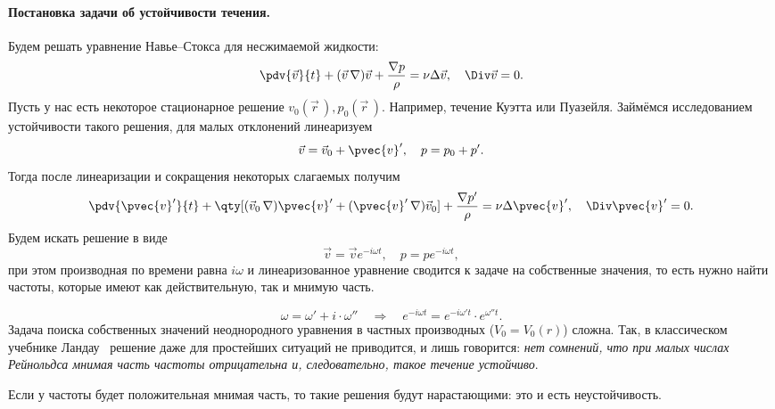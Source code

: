 \paragraph{Постановка задачи об устойчивости течения.} Будем решать
уравнение Навье--Стокса для несжимаемой жидкости:
\begin{equation}
    \pdv{\vec{v}}{t}+ (\vec{v}\,\nabla) \vec{v} + \frac{\nabla p}{\rho}=
    \nu \Delta \vec{v}, \quad \Div \vec{v} = 0.
\end{equation}
Пусть у нас есть некоторое стационарное решение
$v_0(\vec{r}\,), p_0(\vec{r}\,)$.
Например, течение Куэтта или Пуазейля. Займёмся исследованием
устойчивости такого решения, для малых отклонений линеаризуем
\begin{equation}
    \vec{v}=\vec{v}_0+\pvec{v}', \quad p = p_0 +p'.
\end{equation}
Тогда после линеаризации и сокращения некоторых слагаемых получим
\begin{equation}
    \pdv{\pvec{v}'}{t}+\qty[(\vec{v}_0\,\nabla) \pvec{v}'+
        (\pvec{v}'\,\nabla)\vec{v}_0] + \frac{\nabla p'}{\rho}=
    \nu \Delta \pvec{v}', \quad \Div \pvec{v}' = 0.
\end{equation}
Будем искать решение в виде
\begin{equation}
    \vec{v} = \vec{v}e^{-i\omega t}, \quad
    p = p e^{-i\omega t},
\end{equation}
при этом производная по времени равна $i \omega$  и линеаризованное уравнение сводится к задаче на собственные значения, то есть нужно найти частоты, которые имеют как действительную, так и мнимую часть.

\begin{equation}
    \omega = \omega'+i\cdot\omega''
    \quad\Rightarrow\quad
    e^{-i\omega t} = e^{-i\omega' t}\cdot e^{\omega'' t}.
\end{equation}
Задача поиска собственных значений неоднородного уравнения в частных производных ($V_0=V_0(r)$) сложна. Так, в классическом учебнике Ландау~\cite{nu1} решение даже для простейших ситуаций не приводится, и лишь говорится: \textit{нет сомнений, что при малых числах Рейнольдса мнимая часть частоты отрицательна и, следовательно, такое течение устойчиво}.

Если у частоты будет положительная мнимая часть, то такие решения будут нарастающими: это и есть неустойчивость.

\newpage
